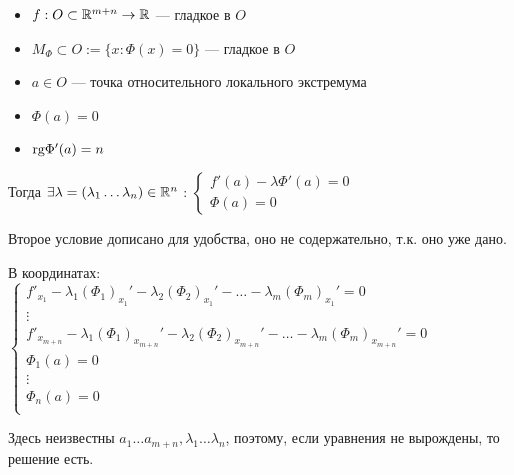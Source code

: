\begin{theorem}\itemfix
    \begin{itemize}
        \item $f: O\subset\mathbb{R}^{m+n} \to\mathbb{R}$ --- гладкое в $O$
        \item $M_\Phi \subset O := \{ x : \Phi(x) = 0 \}$ --- гладкое в $O$
        \item $a\in O$ --- точка относительного локального экстремума
        \item $\Phi(a) = 0$
        \item $\text{rg} \Phi'(a) = n$
    \end{itemize}
    Тогда $\exists \lambda = (\lambda_1 \ldots \lambda_n)\in\mathbb{R}^n$ : $\begin{cases}
            f'(a) - \lambda\Phi'(a) = 0 \\
            \Phi(a) = 0
        \end{cases}$

    Второе условие дописано для удобства, оно не содержательно, т.к. оно уже дано.

    В координатах: $\begin{cases}
            f'_{x_1} - \lambda_1 (\Phi_1)_{x_1}' - \lambda_2 (\Phi_2)_{x_1}' - \ldots - \lambda_m (\Phi_m)_{x_1}' = 0                 \\
            \vdots                                                                                                                    \\
            f'_{x_{m+n}} - \lambda_1 (\Phi_1)_{x_{m+n}}' - \lambda_2 (\Phi_2)_{x_{m+n}}' - \ldots - \lambda_m (\Phi_m)_{x_{m+n}}' = 0 \\
            \Phi_1(a) = 0                                                                                                             \\
            \vdots                                                                                                                    \\
            \Phi_n(a) = 0                                                                                                             \\
        \end{cases}$

    Здесь неизвестны $a_1\ldots a_{m+n}, \lambda_1\ldots \lambda_n$, поэтому, если уравнения не вырождены, то решение есть.
\end{theorem}

